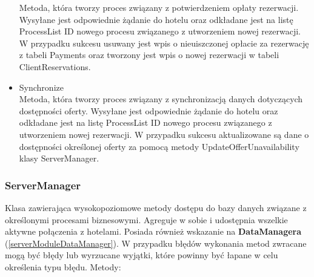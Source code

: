 \documentclass{article}
\begin{document}
\begin{itemize}
    Metoda, która tworzy proces związany z potwierdzeniem opłaty rezerwacji. Wysyłane jest odpowiednie żądanie do hotelu oraz odkładane jest na listę ProcessList ID nowego procesu związanego z utworzeniem nowej rezerwacji. W przypadku sukcesu usuwany jest wpis o nieuiszczonej opłacie za rezerwację z tabeli Payments oraz tworzony jest wpis o nowej rezerwacji w tabeli ClientReservations.
    \item Synchronize\\
    Metoda, która tworzy proces związany z synchronizacją danych dotyczących dostępności oferty. Wysyłane jest odpowiednie żądanie do hotelu oraz odkładane jest na listę ProcessList ID nowego procesu związanego z utworzeniem nowej rezerwacji. W przypadku sukcesu aktualizowane są dane o dostępności określonej oferty za pomocą metody UpdateOfferUnavailability klasy ServerManager.
\end{itemize}

\subsubsection{ServerManager}
Klasa zawierająca wysokopoziomowe metody dostępu do bazy danych związane z określonymi procesami biznesowymi. Agreguje w sobie i udostępnia wszelkie aktywne połączenia z hotelami. Posiada również wskazanie na \textbf{DataManagera} (\ref{serverModuleDataManager}). W przypadku błędów wykonania metod zwracane mogą być błędy lub wyrzucane wyjątki, które powinny być łapane w celu określenia typu błędu. Metody: 
\end{document}
